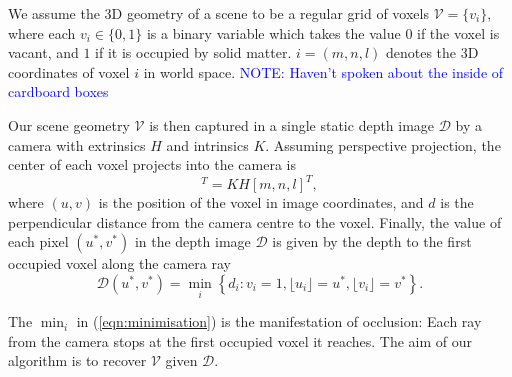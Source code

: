 \documentclass[10pt,twocolumn,letterpaper]{article}
\newcommand{\rgbdimage}{\mathcal{D}}
\newcommand{\intrinsics}{K}
\newcommand{\voxelgrid}{\mathcal{V}}
\newcommand{\voxel}{v}
\newcommand{\voxidx}{i}
\newcommand{\voxelidxs}{m, n, l}
\newcommand{\trans}{T}
\newcommand{\extrinsics}{H}
\newcommand{\voxelgridtoworld}{\trans_{\voxelgrid \rightarrow w}}
\newcommand{\note}[1]{\textcolor{blue}{NOTE: #1}}
\begin{document}
We assume the 3D geometry of a scene to be a regular grid of voxels $\voxelgrid = \{\voxel_\voxidx\}$, where each $\voxel_\voxidx \in \{0, 1\}$ is a binary variable which takes the value $0$ if the voxel is vacant, and $1$ if it is occupied by solid matter.
$\voxidx = (\voxelidxs)$ denotes the 3D coordinates of voxel $\voxidx$ in world space.
\note{Haven't spoken about the inside of cardboard boxes}

Our scene geometry $\voxelgrid$ is then captured in a single static depth image $\rgbdimage$ by a camera with extrinsics $\extrinsics$ and intrinsics $\intrinsics$. 
Assuming perspective projection, the center of each voxel projects into the camera is
\begin{equation}
[u, v, d]^T = \intrinsics \extrinsics [\voxelidxs]^T,
\end{equation}
where $(u,v)$ is the position of the voxel in image coordinates, and $d$ is the  perpendicular distance from the camera centre to the voxel.
Finally, the value of each pixel $(u^*, v^*)$ in the depth image $\rgbdimage$ is given by the depth to the first occupied voxel along the camera ray
\begin{equation}
\rgbdimage(u^*,v^*) = \min_\voxidx \left\{ d_{\voxidx} : v_{\voxidx} = 1, \lfloor u_{\voxidx} \rfloor = u^*, \lfloor v_{\voxidx} \rfloor = v^* \right\}.
\label{eqn:minimisation}
\end{equation}

The $\min_\voxidx$ in (\ref{eqn:minimisation}) is the manifestation of occlusion: Each ray from the camera stops at the first occupied voxel it reaches.
The aim of our algorithm is to recover $\voxelgrid$ given $\rgbdimage$.

\end{document}

